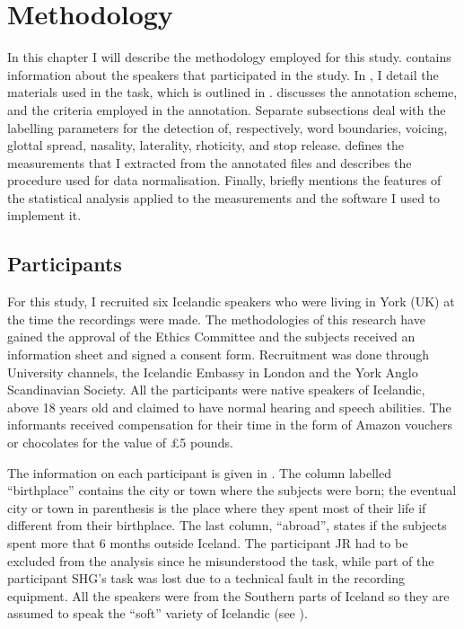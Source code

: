 \documentclass[11pt,a4paper,openany]{memoir}\usepackage[]{graphicx}\usepackage[]{color}
\begin{document}






\chapter{Methodology}
\label{c:methodology}
In this chapter I will describe the methodology employed for this study.
 contains information about the speakers that participated in the study.
In , I detail the materials used in the task, which is outlined in .
 discusses the annotation scheme, and the criteria employed in the annotation.
Separate subsections deal with the labelling parameters for the detection of, respectively, word boundaries, voicing, glottal spread, nasality, laterality, rhoticity, and stop release.
 defines the measurements that I extracted from the annotated files and describes the procedure used for data normalisation.
Finally,  briefly mentions the features of the statistical analysis applied to the measurements and the software I used to implement it.

\section{Participants}
\label{s:participants}

For this study, I recruited six Icelandic speakers who were living in York (UK) at the time the recordings were made.
The methodologies of this research have gained the approval of the Ethics Committee and the subjects received an information sheet and signed a consent form.
Recruitment was done through University channels, the Icelandic Embassy in London and the York Anglo Scandinavian Society.
All the participants were native speakers of Icelandic, above 18 years old and claimed to have normal hearing and speech abilities.
The informants received compensation for their time in the form of Amazon vouchers or chocolates for the value of £5 pounds.

The information on each participant is given in .
The column labelled ``birthplace'' contains the city or town where the subjects were born; the eventual city or town in parenthesis is the place where they spent most of their life if different from their birthplace.
The last column, ``abroad'', states if the subjects spent more that 6 months outside Iceland.
The participant JR had to be excluded from the analysis since he misunderstood the task, while part of the participant SHG's task was lost due to a technical fault in the recording equipment.
All the speakers were from the Southern parts of Iceland so they are assumed to speak the ``soft'' variety of Icelandic (see ).
\end{document}
